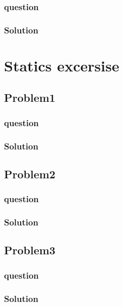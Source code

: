\documentclass[journal,12pt,twocolumn]{IEEEtran}
\begin{document}
\subsubsection{question}

\subsubsection{Solution}




\section{Statics excersise}
\subsection{Problem1}
\subsubsection{question}

\subsubsection{Solution}


\subsection{Problem2}
\subsubsection{question}

\subsubsection{Solution}


\subsection{Problem3}
\subsubsection{question}

\subsubsection{Solution}

\end{document}
